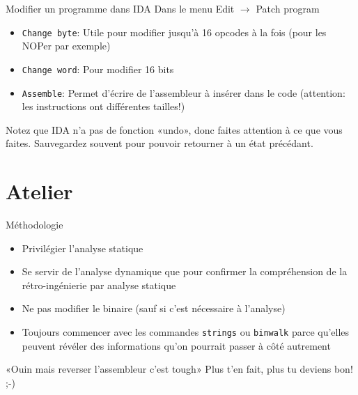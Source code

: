 \documentclass[10pt,xcolor={table,dvipsnames},t]{beamer}
\begin{document}
\begin{frame}{Modifier un programme dans IDA}
    Dans le menu Edit $\rightarrow$  Patch program
    \begin{itemize}
        \item \texttt{Change byte}: Utile pour modifier jusqu'à 16 opcodes à la fois (pour les NOPer par exemple)
        \item \texttt{Change word}: Pour modifier 16 bits
        \item \texttt{Assemble}: Permet d'écrire de l'assembleur à insérer dans le code (attention: les instructions ont différentes tailles!)
    \end{itemize}
    
    Notez que IDA n'a pas de fonction «undo», donc faites attention à ce que vous faites. Sauvegardez souvent pour pouvoir retourner à un état précédant.
\end{frame}


\section{Atelier}

\begin{frame}{Méthodologie}
    \begin{itemize}
        \item Privilégier l'analyse statique
        \item Se servir de l'analyse dynamique que pour confirmer la compréhension de la rétro-ingénierie par analyse statique
        \item Ne pas modifier le binaire (sauf si c'est nécessaire à l'analyse)
        \item Toujours commencer avec les commandes \texttt{strings} ou \texttt{binwalk} parce qu'elles peuvent révéler des informations qu'on pourrait passer à côté autrement
    \end{itemize}
    
    
    \begin{block}{«Ouin mais reverser l'assembleur c'est tough»}
        Plus t'en fait, plus tu deviens bon!  ;-)
    \end{block}
\end{frame}
\end{document}

